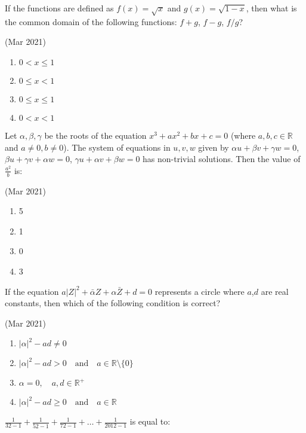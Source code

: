 

\iffalse
\title{March:2021}
\author{AI24BTECH11007}
\section{mcq-single}
\fi
	\item
		If the functions are defined as $f(x)=\sqrt{x}$ and $g(x)=\sqrt{1-x}$, then what is the common domain of the following functions: $f+g$, $f-g$, $f/g$?

		\hfill{(Mar 2021)}
		\begin{multicols}{4}
		\begin{enumerate}
    \item $0 < x \leq 1$
    \item $0 \leq x < 1$
    \item $0 \leq x \leq 1$
    \item $0 < x < 1$
                \end{enumerate}
		\end{multicols}
	\item
		Let $\alpha, \beta, \gamma$ be the roots of the equation $x^3 + ax^2 + bx + c = 0$ (where $a, b, c \in \mathbb{R}$ and $a \neq 0, b \neq 0$). The system of equations in $u, v, w$ given by $\alpha u + \beta v + \gamma w = 0$, $\beta u + \gamma v + \alpha w = 0$, $\gamma u + \alpha v + \beta w = 0$ has non-trivial solutions. Then the value of $\frac{a^2}{b}$ is:

			\hfill{(Mar 2021)}
		\begin{multicols}{4}
               \begin{enumerate}
    \item 5
    \item 1
    \item 0
    \item 3
               \end{enumerate}
		\end{multicols}
       \item
	       If the equation $a{|Z|}^2 + \bar{\alpha}Z + \alpha \bar{Z} + d = 0$ represents a circle where $a$,$d$ are real constants, then which of the following condition is correct?

			\hfill{(Mar 2021)}
			\begin{multicols}{2}
		\begin{enumerate}
    \item $|\alpha|^2 - ad \neq 0$
    \item $|\alpha|^2 - ad > 0 \quad \text{and} \quad a \in \mathbb{R} \setminus \{0\}$
    \item $\alpha = 0, \quad a, d \in \mathbb{R}^+$
    \item $|\alpha|^2 - ad \geq 0 \quad \text{and} \quad a \in \mathbb{R}$
                \end{enumerate}
			\end{multicols}
	\item
		$ \frac{1}{32 - 1} + \frac{1}{52 - 1} + \frac{1}{72 - 1} + \ldots + \frac{1}{2012 - 1} $ is equal to:

